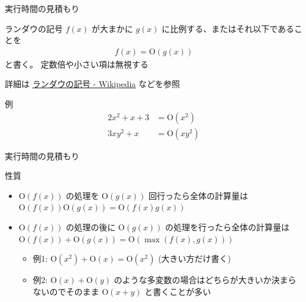 \documentclass[dvipdfmx]{beamer}
\begin{document}
\begin{frame}{実行時間の見積もり}
  \begin{block}{ランダウの記号}
    $f(x)$ が大まかに $g(x)$ に比例する、またはそれ以下であることを
    \begin{align*}
      f(x) = \mathrm{O}(g(x))
    \end{align*}
    と書く。 定数倍や小さい項は無視する

    詳細は \href{https://ja.wikipedia.org/wiki/\%E3\%83\%A9\%E3\%83\%B3\%E3\%83\%80\%E3\%82\%A6\%E3\%81\%AE\%E8\%A8\%98\%E5\%8F\%B7}{ランダウの記号 - Wikipedia}
    などを参照
  \end{block}

  \begin{block}{例}
    \begin{align*}
      2 x^2 + x + 3 &= \mathrm{O}(x^2) \\
      3xy^2 + x &= \mathrm{O}(xy^2)
    \end{align*}
  \end{block}
\end{frame}

\begin{frame}{実行時間の見積もり}
  \begin{block}{性質}
    \begin{itemize}
      \item $\mathrm{O}(f(x))$ の処理を $\mathrm{O}(g(x))$ 回行ったら全体の計算量は $\mathrm{O}(f(x))\mathrm{O}(g(x)) = \mathrm{O}(f(x)g(x))$
      \item $\mathrm{O}(f(x))$ の処理の後に $\mathrm{O}(g(x))$ の処理を行ったら全体の計算量は $\mathrm{O}(f(x)) + \mathrm{O}(g(x)) = \mathrm{O}(\max(f(x),g(x)))$
      \begin{itemize}
        \item 例1: $\mathrm{O}(x^2) + \mathrm{O}(x) = \mathrm{O}(x^2)$ (大きい方だけ書く)
        \item 例2: $\mathrm{O}(x) + \mathrm{O}(y)$ のような多変数の場合はどちらが大きいか決まらないのでそのまま $\mathrm{O}(x + y)$ と書くことが多い
      \end{itemize}
    \end{itemize}
  \end{block}
\end{frame}
\end{document}
